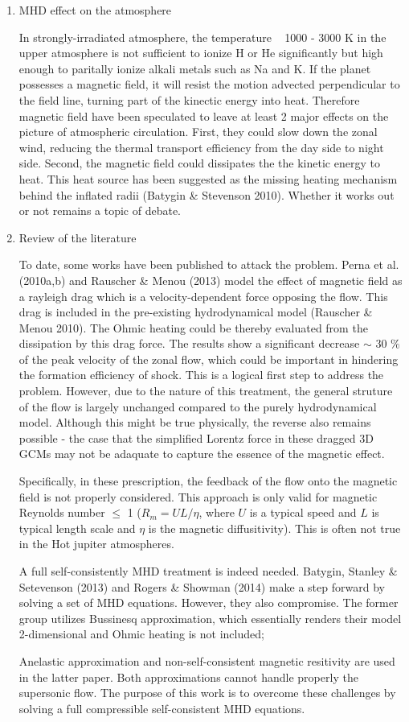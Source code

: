\documentclass[11pt]{article}
\begin{document}
\begin{enumerate}
\item MHD effect on the atmosphere

In strongly-irradiated atmosphere, the temperature ~ 1000 - 3000 K in the upper atmosphere is not sufficient to ionize H or He significantly but high enough to paritally ionize alkali metals such as Na and K. If the planet possesses a magnetic field, it will resist the motion advected perpendicular to the field line, turning part of the kinectic energy into heat. Therefore magnetic field have been speculated to leave at least 2 major effects on the picture of atmospheric circulation. First, they could slow down the zonal wind, reducing the thermal transport efficiency from the day side to night side. Second, the magnetic field could dissipates the the kinetic energy to heat. This heat source has been suggested as the missing heating mechanism behind the inflated radii (Batygin \& Stevenson 2010). Whether it works out or not remains a topic of debate. 


\item Review of the literature

To date, some works have been published to attack the problem. Perna et al. (2010a,b) and Rauscher \& Menou (2013) model the effect of magnetic field as a rayleigh drag which is a velocity-dependent force opposing the flow. This drag is included in the pre-existing hydrodynamical model (Rauscher \& Menou 2010). The Ohmic heating could be thereby evaluated from the dissipation by this drag force. The results show a significant decrease  $\sim$ 30 \% of the peak velocity of the zonal flow, which could be important in hindering the formation efficiency of shock. This is a logical first step to address the problem. However, due to the nature of this treatment, the general struture of the flow is largely unchanged compared to the purely hydrodynamical model. Although this might be true physically, the reverse also remains possible - the case that the simplified Lorentz force in these dragged 3D GCMs may not be adaquate to capture the essence of the magnetic effect. 

Specifically, in these prescription, the feedback of the flow onto the magnetic field is not properly considered. This approach is only valid for magnetic Reynolds number $\leq$ 1 ($R_m = UL/\eta$, where  $U$ is a typical speed and $L$ is typical length scale and $\eta$ is the magnetic diffusitivity). This is often not true in the Hot jupiter atmospheres.

A full self-consistently MHD treatment is indeed needed. Batygin, Stanley \& Setevenson (2013) and Rogers \& Showman (2014) make a step forward by solving a set of MHD equations. However, they also compromise. The former group utilizes Bussinesq approximation, which essentially renders their model 2-dimensional and Ohmic heating is not included; 

Anelastic approximation and non-self-consistent magnetic resitivity are used in the latter paper. Both approximations cannot handle properly the supersonic flow. The purpose of this work is to overcome these challenges by solving a full compressible self-consistent MHD equations. 

\end{enumerate}
\end{document}
